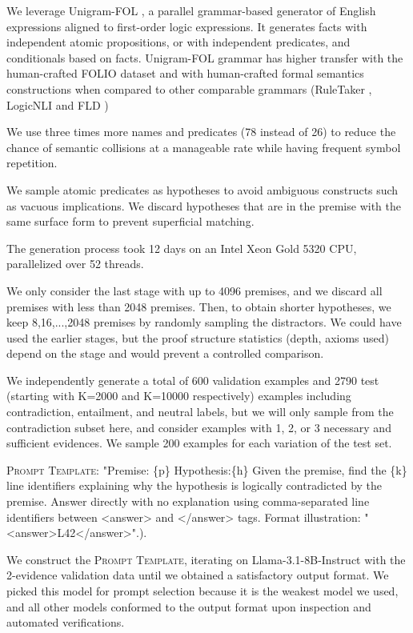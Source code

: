 \documentclass[11pt]{article}
\newcommand{\improvedParbox}[1]{%
  \begin{tcolorbox}[
    enhanced,
    colback=white,
    colframe=gray!50!black,
    boxrule=0.5pt,
    arc=1mm,
    left=3mm,
    right=3mm,
    top=2mm,
    bottom=2mm,
    boxsep=0pt,
    width=\columnwidth
  ]
    #1
  \end{tcolorbox}
}
\begin{document}
We leverage Unigram-FOL 
\cite{sileo2024scaling}, a parallel grammar-based generator of English expressions aligned to first-order logic expressions.
It generates facts with independent atomic propositions, or with independent predicates, and conditionals based on facts. Unigram-FOL grammar has higher transfer with the human-crafted FOLIO dataset \cite{han2022folio} and with human-crafted formal semantics constructions \cite{fragmentsaaai} when compared to other comparable grammars (RuleTaker \cite{ruletaker}, LogicNLI \cite{tian-etal-2021-diagnosing} and FLD \cite{fld23})

We use three times more names and predicates (78 instead of 26) to reduce the chance of semantic collisions at a manageable rate while having frequent symbol repetition.

We sample atomic predicates as hypotheses to avoid ambiguous constructs such as vacuous implications. We discard hypotheses that are in the premise with the same surface form to prevent superficial matching.

The generation process took 12 days on an Intel Xeon Gold 5320 CPU, parallelized over 52 threads.

We only consider the last stage with up to 4096 premises, and we discard all premises with less than 2048 premises.
Then, to obtain shorter hypotheses, we keep 8,16,...,2048 premises by randomly sampling the distractors. We could have used the earlier stages, but the proof structure statistics (depth, axioms used) depend on the stage and would prevent a controlled comparison.

We independently generate a total of 600 validation examples and 2790 test (starting with K=2000 and K=10000 respectively) examples including contradiction, entailment, and neutral labels, but we will only sample from the contradiction subset here, and consider examples with 1, 2, or 3 necessary and sufficient evidences. We sample 200 examples for each variation of the test set.

\improvedParbox{%
\textsc{Prompt Template}\label{Prompt A}: "Premise:
\{p\}
Hypothesis:\{h\}
Given the premise, find the \{k\} line identifiers explaining why the hypothesis is logically contradicted by the premise. Answer directly with no explanation using comma-separated line identifiers between <answer> and </answer> tags. Format illustration: "<answer>L42</answer>".).
}

We construct the \textsc{Prompt Template}, iterating on Llama-3.1-8B-Instruct with the 2-evidence validation data until we obtained a satisfactory output format.  We picked this model for prompt selection because it is the weakest model we used, and all other models conformed to the output format upon inspection and automated verifications.
\end{document}
